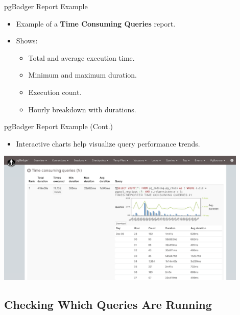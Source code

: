 \documentclass[aspectratio=169]{beamer}
\begin{document}
\begin{frame}{pgBadger Report Example}
\begin{itemize}
    \item Example of a \textbf{Time Consuming Queries} report.
    \item Shows:
    \begin{itemize}
        \item Total and average execution time.
        \item Minimum and maximum duration.
        \item Execution count.
        \item Hourly breakdown with durations.
    \end{itemize}
\end{itemize}
\end{frame}

\begin{frame}{pgBadger Report Example (Cont.)}
\begin{itemize}
    \item Interactive charts help visualize query performance trends.
\end{itemize}
\begin{center}
    \includegraphics[width=0.9\textwidth]{figures/pgbadger}
\end{center}
\end{frame}

\subsection{Checking Which Queries Are Running}
\end{document}
